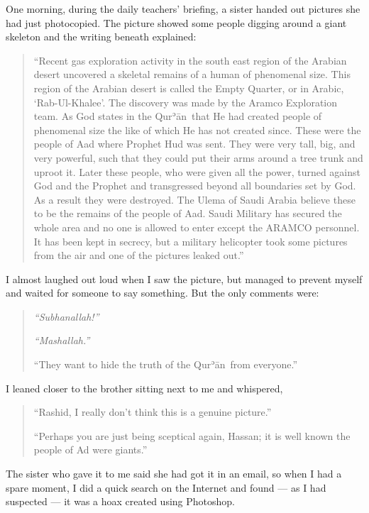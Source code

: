 \documentclass[12pt]{memoir}
\def\´{ʾ} %
\newcommand{\cor}[2]{#2} %
\def \Quran{Qur\-\´ān} %
\begin{document}
One morning, during the daily teachers’ briefing,
a sister handed out pictures she had just photocopied.
The picture showed some people digging around a giant skeleton
and the writing beneath explained:

\begin{quote}
“Recent gas exploration activity in the south east region of the Arabian desert
uncovered a skeletal remains of a human of phenomenal size.
This region of the Arabian desert is called the Empty Quarter,
or in Arabic, ‘Rab-Ul-Khalee’.
The discovery was made by the Aramco Exploration team.
As God states in the \Quran\ that He had created people of phenomenal size
the like of which He has not created since.
These were the people of Aad where Prophet Hud was sent.
They were very tall, big, and very powerful,
such that they could put their arms around a tree trunk and uproot it.
Later these people, who were given all the power,
turned against God and the Prophet and transgressed
beyond all boundaries set by God.
As a result they were destroyed.
The Ulema of Saudi Arabia believe these to be the remains of the people of Aad.
Saudi Military has secured the whole area and no one is allowed
to enter except the ARAMCO personnel.
It has been kept in secrecy, but a military helicopter took some pictures
from the air and one of the pictures leaked out.”
\end{quote}

I almost laughed out loud when I saw the picture,
but managed to prevent myself and waited for someone to say something.
But the only comments were:

\begin{quote}
\emph{“Subhanallah!”}

\emph{“Mashallah.”}

“They want to hide the truth of the \Quran\ from everyone.”
\end{quote}

I leaned closer to the brother sitting next to me and whispered,

\begin{quote}
“Rashid, I really don’t think this is a genuine picture.”

“Perhaps you are just being sceptical again, Hassan;
it is well know\cor{}{n} the people of Ad were giants.”
\end{quote}

The sister who gave it to me said she had got it in an email,
so when I had a spare moment, I did a quick search on the Internet and found —
as I had suspected — it was \cor{}{a} hoax created using Photoshop.
\end{document}
